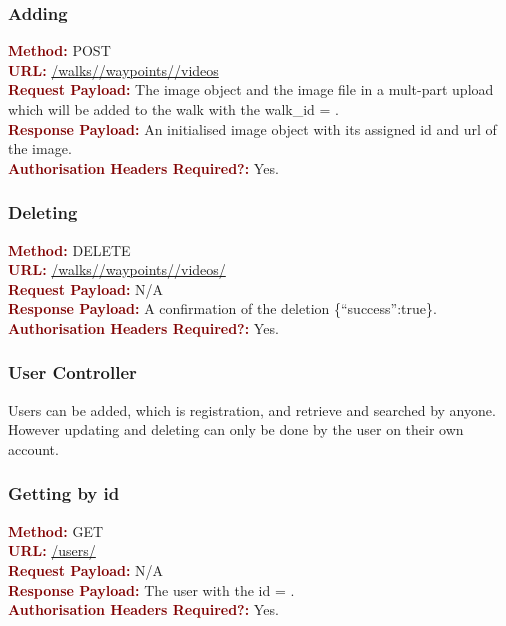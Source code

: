 \documentclass[11pt,a4paper]{report}
\begin{document}
\subsubsection{Adding}
\textbf{\textcolor{Maroon}{Method:}} POST\\
\textbf{\textcolor{Maroon}{URL:}} \url{/walks/}\url{/waypoints/}\url{/videos}\\
\textbf{\textcolor{Maroon}{Request Payload:}} The image object and the image file in a mult-part upload which will be added to the walk with the walk\_id = .\\
\textbf{\textcolor{Maroon}{Response Payload:}} An initialised image object with its assigned id and url of the image.\\
\textbf{\textcolor{Maroon}{Authorisation Headers Required?:}} Yes.

\subsubsection{Deleting}
\textbf{\textcolor{Maroon}{Method:}} DELETE\\
\textbf{\textcolor{Maroon}{URL:}} \url{/walks/}\url{/waypoints/}\url{/videos/}\\
\textbf{\textcolor{Maroon}{Request Payload:}} N/A\\
\textbf{\textcolor{Maroon}{Response Payload:}} A confirmation of the deletion \{``success'':true\}.\\
\textbf{\textcolor{Maroon}{Authorisation Headers Required?:}} Yes.

\subsubsection{User Controller}
Users can be added, which is registration, and retrieve and searched by anyone. However updating and deleting can only be done by the user on their own account.

\subsubsection{Getting by id}
\textbf{\textcolor{Maroon}{Method:}} GET\\
\textbf{\textcolor{Maroon}{URL:}} \url{/users/}\\
\textbf{\textcolor{Maroon}{Request Payload:}} N/A\\
\textbf{\textcolor{Maroon}{Response Payload:}} The user with the id = .\\
\textbf{\textcolor{Maroon}{Authorisation Headers Required?:}} Yes.
\end{document}
